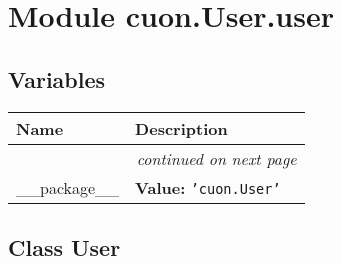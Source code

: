 %
%
%


\section{Module cuon.User.user}

    \label{cuon:User:user}


  \subsection{Variables}

    \vspace{-1cm}
\hspace{\varindent}\begin{longtable}{|p{\varnamewidth}|p{\vardescrwidth}|l}
\cline{1-2}
\cline{1-2} \centering \textbf{Name} & \centering \textbf{Description}& \\
\cline{1-2}
\endhead\cline{1-2}\multicolumn{3}{r}{\small\textit{continued on next page}}\\\endfoot\cline{1-2}
\endlastfoot\raggedright \_\-\_\-p\-a\-c\-k\-a\-g\-e\-\_\-\_\- & \raggedright \textbf{Value:} 
{\tt \texttt{'}\texttt{cuon.User}\texttt{'}}&\\
\cline{1-2}
\end{longtable}



\subsection{Class User}

